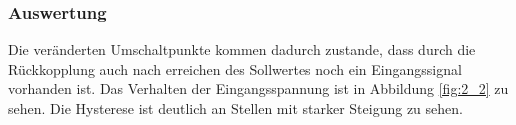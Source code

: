 \documentclass[12pt,a4paper]{article}
\begin{document}
\subsubsection*{Auswertung}

Die veränderten Umschaltpunkte kommen dadurch zustande, dass durch die Rückkopplung auch nach erreichen des Sollwertes noch ein Eingangssignal vorhanden ist. Das Verhalten der Eingangsspannung ist in Abbildung \ref{fig:2_2} zu sehen. Die Hysterese ist deutlich an Stellen mit starker Steigung zu sehen.
\end{document}
